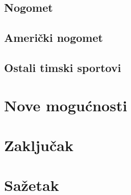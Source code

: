 \documentclass{ferseminar}
\begin{document}
\subsection{Nogomet}

\subsection{Američki nogomet}

\subsection{Ostali timski sportovi}

\section{Nove mogućnosti}
\section{Zaključak}
\section{Sažetak}
\end{document}
